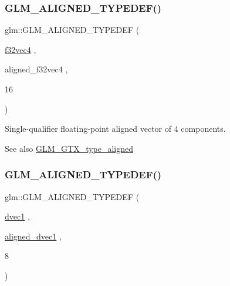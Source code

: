 \subsubsection{\texorpdfstring{G\+L\+M\+\_\+\+A\+L\+I\+G\+N\+E\+D\+\_\+\+T\+Y\+P\+E\+D\+E\+F()}{GLM\_ALIGNED\_TYPEDEF()}\hspace{0.1cm}{\footnotesize\ttfamily [154/209]}}
{\footnotesize\ttfamily glm\+::\+G\+L\+M\+\_\+\+A\+L\+I\+G\+N\+E\+D\+\_\+\+T\+Y\+P\+E\+D\+EF (\begin{DoxyParamCaption}\item[{\hyperlink{group__gtc__type__precision_ga03e165a8b1ffe77625530fa335699e06}{f32vec4}}]{,  }\item[{aligned\+\_\+f32vec4}]{,  }\item[{16}]{ }\end{DoxyParamCaption})}

Single-\/qualifier floating-\/point aligned vector of 4 components. \begin{DoxySeeAlso}{See also}
\hyperlink{group__gtx__type__aligned}{G\+L\+M\+\_\+\+G\+T\+X\+\_\+type\+\_\+aligned} 
\end{DoxySeeAlso}
\mbox{\label{group__gtx__type__aligned_ga3e0f35fa0c626285a8bad41707e7316c}} 
\subsubsection{\texorpdfstring{G\+L\+M\+\_\+\+A\+L\+I\+G\+N\+E\+D\+\_\+\+T\+Y\+P\+E\+D\+E\+F()}{GLM\_ALIGNED\_TYPEDEF()}\hspace{0.1cm}{\footnotesize\ttfamily [155/209]}}
{\footnotesize\ttfamily glm\+::\+G\+L\+M\+\_\+\+A\+L\+I\+G\+N\+E\+D\+\_\+\+T\+Y\+P\+E\+D\+EF (\begin{DoxyParamCaption}\item[{\hyperlink{group__ext__vec1_ga8d5252eec287cf34cc18a219a118f9f2}{dvec1}}]{,  }\item[{\hyperlink{group__gtc__type__aligned_ga81fe4410dc880770293c53fcba83c9e4}{aligned\+\_\+dvec1}}]{,  }\item[{8}]{ }\end{DoxyParamCaption})}

